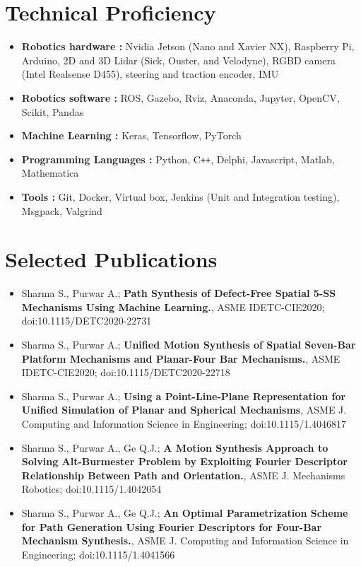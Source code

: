 \documentclass[letterpaper,10pt]{article}
\newcommand{\resumeSection}[1]{
\vspace{-12pt}
\section{\textbf{#1}}
}
\newcommand{\resumeItemListStart}{
\vspace{-7pt}
\begin{itemize}[leftmargin=14pt]
}
\newcommand{\resumeItemListEnd}{
\vspace{+7pt}
\end{itemize}
}
\newcommand{\resumeItem}[1]{
  \item\small{
      {#1 \vspace{-7pt}
      }
  }
}
\begin{document}
\resumeSection{Technical Proficiency}
	\vspace{+7pt}
	\resumeItemListStart
	\resumeItem{\textbf{Robotics hardware :}  Nvidia Jetson (Nano and Xavier NX), Raspberry Pi, Arduino, 2D and 3D Lidar (Sick, Ouster, and Velodyne), RGBD camera (Intel Realsense D455), steering and traction encoder, IMU}
	\resumeItem{\textbf{Robotics software :} ROS, Gazebo, Rviz, Anaconda, Jupyter, OpenCV, Scikit, Pandas}
	\resumeItem{\textbf{Machine Learning :} Keras, Tensorflow, PyTorch}
	\resumeItem{\textbf{Programming Languages :} Python, C\texttt{++}, Delphi, Javascript, Matlab, Mathematica}
	\resumeItem{\textbf{Tools :} Git, Docker, Virtual box, Jenkins (Unit and Integration testing), Msgpack, Valgrind}
	\resumeItemListEnd


\resumeSection{Selected Publications}
\vspace{+7pt}
\resumeItemListStart
\resumeItem{Sharma S., Purwar A.; \textbf{Path Synthesis of Defect-Free Spatial 5-SS Mechanisms Using Machine Learning.}, ASME IDETC-CIE2020; doi:10.1115/DETC2020-22731}
\resumeItem{Sharma S., Purwar A.; \textbf{Unified Motion Synthesis of Spatial Seven-Bar Platform Mechanisms and Planar-Four Bar Mechanisms.}, ASME IDETC-CIE2020; doi:10.1115/DETC2020-22718}
\resumeItem{Sharma S., Purwar A.; \textbf{Using a Point-Line-Plane Representation for Unified Simulation of Planar and Spherical Mechanisms}, ASME J. Computing and Information Science in Engineering; doi:10.1115/1.4046817}
\resumeItem{Sharma S., Purwar A., Ge Q.J.; \textbf{A Motion Synthesis Approach to Solving Alt-Burmester Problem by Exploiting Fourier Descriptor Relationship Between Path and Orientation.}, ASME J. Mechanisms Robotics; doi:10.1115/1.4042054}
\resumeItem{Sharma S., Purwar A., Ge Q.J.; \textbf{An Optimal Parametrization Scheme for Path Generation Using Fourier Descriptors for Four-Bar Mechanism Synthesis.}, ASME J. Computing and Information Science in Engineering; doi:10.1115/1.4041566}
\resumeItemListEnd
\end{document}
